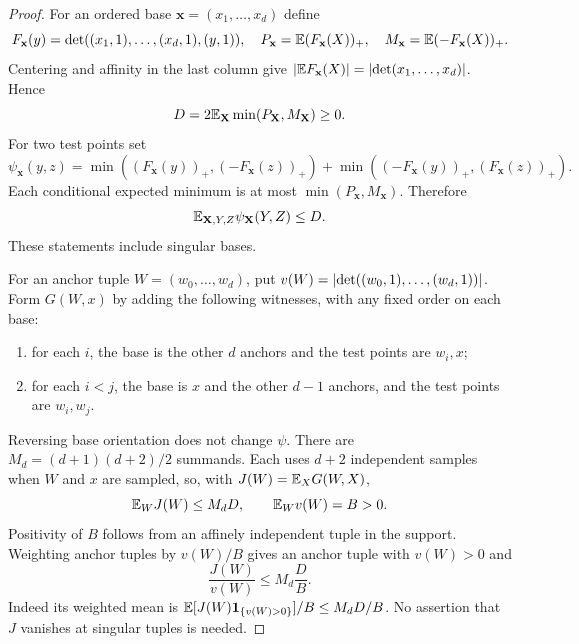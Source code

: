 \begin{proof}
For an ordered base $\mathbf x=(x_1,\ldots,x_d)$ define
\[
 F_{\mathbf x}(y)=\det((x_1,1),\ldots,(x_d,1),(y,1)),\quad
 P_{\mathbf x}=\mathbb E(F_{\mathbf x}(X))_+,\quad
 M_{\mathbf x}=\mathbb E(-F_{\mathbf x}(X))_+.
\]
Centering and affinity in the last column give
$\lvert \mathbb E F_{\mathbf x}(X)\rvert=\lvert \det(x_1,\ldots,x_d)\rvert$. Hence
\begin{equation}\label{eq:Dsign}
 D=2\mathbb E_{\mathbf X}\min(P_{\mathbf X},M_{\mathbf X})\ge0.
\end{equation}
For two test points set
\[
 \psi_{\mathbf x}(y,z)=
 \min((F_{\mathbf x}(y))_+,(-F_{\mathbf x}(z))_+)
 +\min((-F_{\mathbf x}(y))_+,(F_{\mathbf x}(z))_+).
\]
Each conditional expected minimum is at most
$\min(P_{\mathbf x},M_{\mathbf x})$. Therefore
\begin{equation}\label{eq:psibudget}
 \mathbb E_{\mathbf X,Y,Z}\psi_{\mathbf X}(Y,Z)\le D.
\end{equation}
These statements include singular bases.

For an anchor tuple $W=(w_0,\ldots,w_d)$, put
$v(W)=\lvert \det((w_0,1),\ldots,(w_d,1))\rvert$. Form $G(W,x)$ by adding the
following witnesses, with any fixed order on each base:
\begin{enumerate}[label=(\roman*),leftmargin=2em]
\item for each $i$, the base is the other $d$ anchors and the test points
are $w_i,x$;
\item for each $i<j$, the base is $x$ and the other $d-1$ anchors, and the
test points are $w_i,w_j$.
\end{enumerate}
Reversing base orientation does not change $\psi$. There are
$M_d=(d+1)(d+2)/2$ summands. Each uses $d+2$ independent samples when
$W$ and $x$ are sampled, so, with $J(W)=\mathbb E_XG(W,X)$,
\[
 \mathbb E_WJ(W)\le M_dD,\qquad \mathbb E_Wv(W)=B>0.
\]
Positivity of $B$ follows from an affinely independent tuple in the support.
Weighting anchor tuples by $v(W)/B$ gives an anchor tuple with $v(W)>0$ and
\begin{equation}\label{eq:weightedchoice}
 \frac{J(W)}{v(W)}\le M_d\frac{D}{B}.
\end{equation}
Indeed its weighted mean is
$\mathbb E[J(W)\mathbf1_{\{v(W)>0\}}]/B\le M_dD/B$.
No assertion that $J$ vanishes at singular tuples is needed.


\end{proof}
